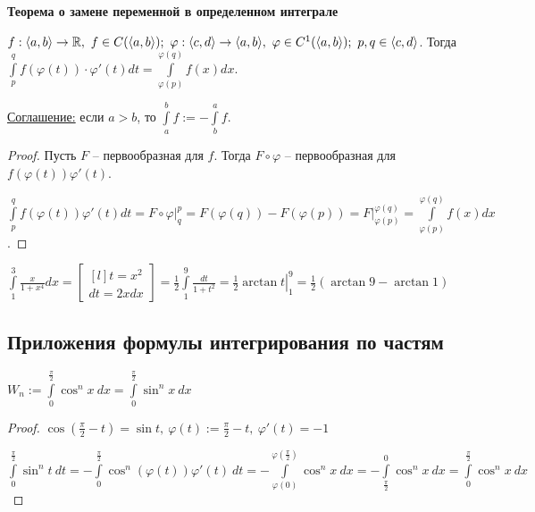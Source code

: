 \begin{theorem}
    \textbf{Теорема о замене переменной в определенном интеграле}

    $f:\langle a, b \rangle \rightarrow \R,\ f\in C(\langle a, b\rangle);\ \varphi: \langle c, d\rangle\rightarrow \langle a, b\rangle,\ \varphi\in C^{1}(\langle a, b\rangle);\ p, q\in \langle c, d\rangle$. Тогда $\int\limits_p^q f(\varphi(t))\cdot \varphi '(t)dt=\int\limits_{\varphi(p)}^{\varphi(q)}f(x)dx$.

    \underline{Соглашение:} если $a>b$, то $\int\limits_a^b f:=-\int\limits_b^a f$.
\end{theorem}

\begin{proof}
    Пусть $F$ – первообразная для $f$. Тогда $F\circ \varphi$ – первообразная для $f(\varphi(t)) \varphi'(t)$.

    $\int\limits_p^q f(\varphi(t)) \varphi '(t)dt=\left.F\circ \varphi\right|_q^p=F(\varphi(q))-F(\varphi(p))=\left. F\right|_{\varphi(p)}^{\varphi(q)}=\int\limits_{\varphi(p)}^{\varphi(q)}f(x)dx$.
\end{proof}

\begin{example}
    $\int\limits_1^3\frac{x}{1+x^4}dx=\begin{bmatrix*}[l]t=x^2 \\ dt=2xdx \end{bmatrix*}=\frac{1}{2}\int\limits_1^9 \frac{dt}{1+t^2}=\left.\frac{1}{2}\arctan t\right|_1^9=\frac{1}{2}(\arctan 9 - \arctan 1)$
\end{example}

\subsection{Приложения формулы интегрирования по частям}
\begin{example}
    $W_n:=\int\limits_0^{\frac{\pi}{2}}\cos ^n x\ dx=\int\limits_0^{\frac{\pi}{2}}\sin ^n x\ dx$
\end{example}

\begin{proof}
    $\cos(\frac{\pi}{2}-t)=\sin t,\ \varphi(t):=\frac{\pi}{2}-t,\ \varphi'(t)=-1$

    $\int\limits_0^{\frac{\pi}{2}}\sin ^n t\ dt=-\int\limits_0^{\frac{\pi}{2}}\cos ^n(\varphi(t))\varphi'(t)\ dt=-\int\limits_{\varphi(0)}^{\varphi(\frac{\pi}{2})}\cos ^n x\ dx=-\int\limits^0_{\frac{\pi}{2}}\cos ^n x\ dx=\int\limits_0^{\frac{\pi}{2}}\cos ^n x\ dx$
\end{proof}

